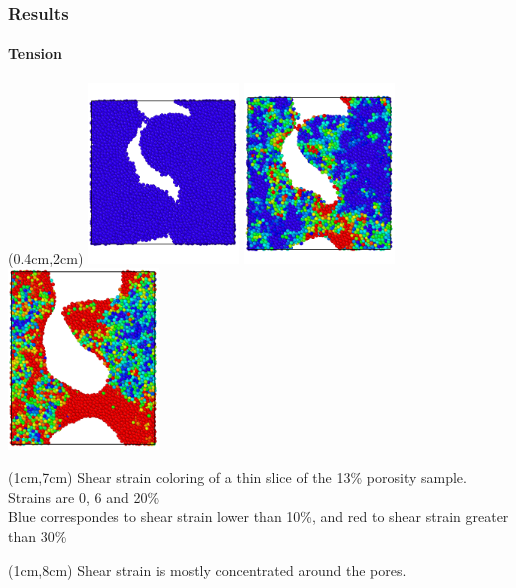 \documentclass[12pt,t]{beamer}
\begin{document}
\begin{frame}
    \frametitle{Results}
    \framesubtitle{Tension}
    \begin{textblock*}{6.5cm}(0.4cm,2cm) %
        \includegraphics[width=4cm]{Presentacion_PANACM_Franco/13_0strain.png}
        \includegraphics[width=4cm]{Presentacion_PANACM_Franco/13_6strain_tens.png}
        \includegraphics[width=4cm]{Presentacion_PANACM_Franco/13_20strain_tens_2.png}
    \end{textblock*}
    \begin{textblock*}{11cm}(1cm,7cm) %
        \centering
        \tiny{Shear strain coloring of a thin slice of the 13\% porosity sample. Strains are 0, 6 and 20\%\\Blue correspondes to shear strain lower than 10\%, and red to shear strain greater than 30\%}
    \end{textblock*}
    \begin{textblock*}{11.5cm}(1cm,8cm) %
        Shear strain is mostly concentrated around the pores.
    \end{textblock*}
\end{frame}
\end{document}
